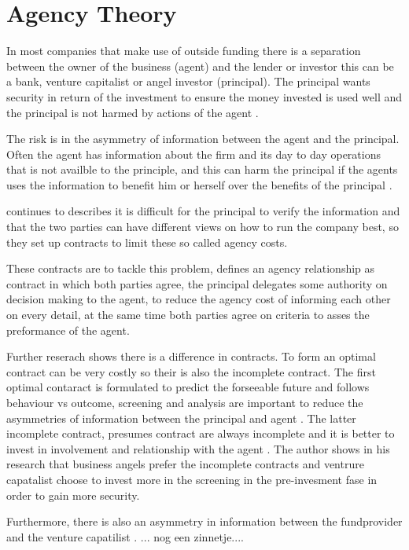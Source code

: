 \documentclass[a4paper, 11pt]{article}
\begin{document}
\section{Agency Theory}

In most companies that make use of outside funding there is a separation between
the owner of the business (agent) and the lender or investor this can be a
bank, venture capitalist or angel investor (principal). The principal wants
security in return of the investment to ensure the money invested is used well
and the principal is not harmed by actions of the agent \citep{jensen1976theory}.

The risk is in the asymmetry of information between the agent and the principal. Often the
agent has information about the firm and its day to day operations that is not
availble to the principle, and this can harm the principal if the agents uses the
information to benefit him or herself over the benefits of the principal
\citep{Osnabrugge2000}. 

\cite{Osnabrugge2000} continues to describes it is difficult for the principal to verify the information and that the two parties can have different views on how to run the company best, so they set up contracts to limit these so called agency costs.


These contracts are to tackle this problem, \citep{jensen1976theory} defines an agency relationship as contract in which both parties agree, the principal delegates some authority on decision making to the agent, to reduce the agency cost of informing each other on every detail, at the same time both parties agree on criteria to asses the preformance of the agent. 

Further reserach shows there is a difference in contracts. To form an optimal contract can be very costly so their is also the incomplete contract. The first optimal contaract is formulated to predict the forseeable future and follows behaviour vs outcome, screening and analysis are important to reduce the asymmetries of information between the principal and agent \citep{Osnabrugge2000}. The latter incomplete contract, presumes contract are always incomplete and it is better to invest in involvement and relationship with the agent \citep{Osnabrugge2000}. The author shows in his research that business angels prefer the incomplete contracts and ventrure capatalist choose to invest more in the screening in the pre-invesment fase in order to gain more security.

Furthermore, there is also an asymmetry in information between the fundprovider and the venture capatilist \citep{casson2008oxford}. ... nog een zinnetje....
\end{document}
